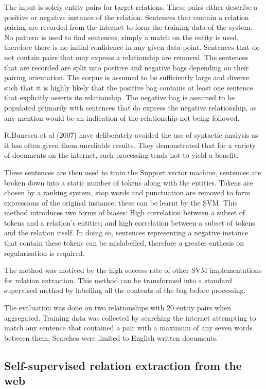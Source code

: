 \documentclass{ecmm427_assignment}
\begin{document}
The input is solely entity pairs for target relations. These pairs either describe a positive or negative instance of the relation. Sentences that contain a relation pairing are recorded from the internet to form the training data of the system. No pattern is used to find sentences, simply a match on the entity is used, therefore there is no initial confidence in any given data point. Sentences that do not contain pairs that may express a relationship are removed. The sentences that are recorded are split into positive and negative bags depending on their pairing orientation. The corpus is assumed to be sufficiently large and diverse such that it is highly likely that the positive bag contains at least one sentence that explicitly asserts its relationship. The negative bag is assumed to be populated primarily with sentences that do express the negative relationship, as any mention would be an indication of the relationship not being followed.

R.Bunescu et al (2007) have deliberately avoided the use of syntactic analysis as it has often given them unreliable results. They demonstrated that for a variety of documents on the internet, such processing tends not to yield a benefit. 

These sentences are then used to train the Support vector machine, sentences are broken down into a static number of tokens along with the entities. Tokens are chosen by a ranking system, stop words and punctuation are removed to form expressions of the original instance, these can be learnt by the SVM. This method introduces two forms of biases: High correlation between a subset of tokens and a relation's entities; and high correlation between a subset of tokens and the relation itself. In doing so, sentences representing a negative instance that contain these tokens can be mislabelled, therefore a greater enthesis on regularisation is required.

The method was motived by the high success rate of other SVM implementations for relation extraction. This method can be transformed into a standard supervised method by labelling all the contents of the bag before processing.

The evaluation was done on two relationships with 20 entity pairs when aggregated. Training data was collected by searching the internet attempting to match any sentence that contained a pair with a maximum of any seven words between them. Searches were limited to English written documents.

\subsection{Self-supervised relation extraction from the web}
\end{document}
